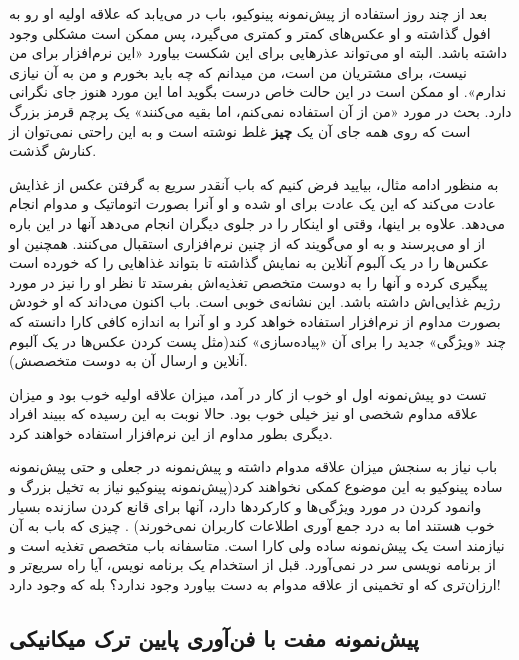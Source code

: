 بعد از چند روز استفاده از پیش‌نمونه پینوکیو، باب در می‌یابد که علاقه
اولیه او رو به افول گذاشته و او عکس‌های کمتر و کمتری می‌گیرد، پس ممکن
است مشکلی وجود داشته باشد. البته او می‌تواند عذرهایی برای این شکست
بیاورد «این نرم‌افزار برای من نیست، برای مشتریان من است، من میدانم که چه
باید بخورم و من به آن نیازی ندارم». او ممکن است در این حالت خاص درست
بگوید اما این مورد هنوز جای نگرانی دارد. بحث در مورد «من از آن استفاده
نمی‌کنم، اما بقیه می‌کنند» یک پرچم قرمز بزرگ است که روی همه جای آن یک
\textbf{چیز} غلط نوشته است و به این راحتی نمی‌توان از کنارش گذشت.

به منظور ادامه مثال، بیایید فرض کنیم که باب آنقدر سریع به گرفتن عکس از
غذایش عادت می‌کند که این یک عادت برای او شده و او آنرا بصورت اتوماتیک و
مدوام انجام می‌دهد. علاوه بر اینها، وقتی او اینکار را در جلوی دیگران
انجام می‌دهد آنها در این باره از او می‌پرسند و به او می‌گویند که از چنین
نرم‌افزاری استقبال می‌کنند. همچنین او عکس‌ها را در یک آلبوم آنلاین به
نمایش گذاشته تا بتواند غذاهایی را که خورده است پیگیری کرده و آنها را به
دوست متخصص تغذیه‌اش بفرستد تا نظر او را نیز در مورد رژیم غذایی‌اش داشته
باشد. این نشانه‌ی خوبی است. باب اکنون می‌داند که او خودش بصورت مداوم از
نرم‌افزار استفاده خواهد کرد و او آنرا به اندازه کافی کارا دانسته که چند
«ویژگی» جدید را برای آن «پیاده‌سازی» کند(مثل پست کردن عکس‌ها در یک آلبوم
آنلاین و ارسال آن به دوست متخصصش).

تست دو پیش‌نمونه اول او خوب از کار در آمد، میزان علاقه اولیه خوب بود و
میزان علاقه مداوم شخصی او نیز خیلی خوب بود. حالا نوبت به این رسیده که
ببیند افراد دیگری بطور مداوم از این نرم‌افزار استفاده خواهند کرد.

باب نیاز به سنجش میزان علاقه مدوام داشته و پیش‌نمونه در جعلی و حتی
پیش‌نمونه ساده پینوکیو به این موضوع کمکی نخواهند کرد(پیش‌نمونه پینوکیو
نیاز به تخیل بزرگ و وانمود کردن در مورد ویژگی‌ها و کارکردها دارد، آنها
برای قانع کردن سازنده بسیار خوب هستند اما به درد جمع آوری اطلاعات
کاربران نمی‌خورند) . چیزی که باب به آن نیازمند است یک پیش‌نمونه ساده ولی
کارا است. متاسفانه باب متخصص تغذیه است و از برنامه نویسی سر در نمی‌آورد.
قبل از استخدام یک برنامه نویس، آیا راه سریع‌تر و ارزان‌تری که او تخمینی
از علاقه مدوام به دست بیاورد وجود ندارد؟ بله که وجود دارد!

\subsection{پیش‌نمونه مفت با فن‌آوری پایین ترک
میکانیکی}\label{ux67eux6ccux634ux646ux645ux648ux646ux647-ux645ux641ux62a-ux628ux627-ux641ux646ux622ux648ux631ux6cc-ux67eux627ux6ccux6ccux646-ux62aux631ux6a9-ux645ux6ccux6a9ux627ux646ux6ccux6a9ux6cc}

